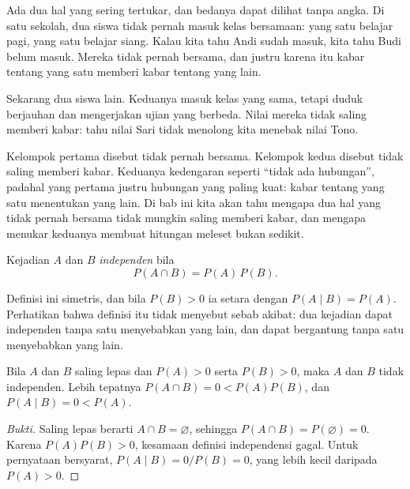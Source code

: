 
\begin{untukanak}
Ada dua hal yang sering tertukar, dan bedanya dapat dilihat tanpa angka. Di satu
sekolah, dua siswa tidak pernah masuk kelas bersamaan: yang satu belajar pagi, yang satu
belajar siang. Kalau kita tahu Andi sudah masuk, kita tahu Budi belum masuk. Mereka tidak
pernah bersama, dan justru karena itu kabar tentang yang satu memberi kabar tentang yang
lain.

Sekarang dua siswa lain. Keduanya masuk kelas yang sama, tetapi duduk berjauhan dan
mengerjakan ujian yang berbeda. Nilai mereka tidak saling memberi kabar: tahu nilai Sari
tidak menolong kita menebak nilai Tono.

Kelompok pertama disebut tidak pernah bersama. Kelompok kedua disebut tidak saling
memberi kabar. Keduanya kedengaran seperti ``tidak ada hubungan'', padahal yang pertama
justru hubungan yang paling kuat: kabar tentang yang satu menentukan yang lain. Di bab
ini kita akan tahu mengapa dua hal yang tidak pernah bersama tidak mungkin saling memberi
kabar, dan mengapa menukar keduanya membuat hitungan meleset bukan sedikit.
\end{untukanak}


\begin{definisi}
Kejadian $A$ dan $B$ \emph{independen} bila
\[
P(A\cap B)=P(A)\,P(B).
\]
\end{definisi}

Definisi ini simetris, dan bila $P(B)>0$ ia setara dengan $P(A\mid B)=P(A)$. Perhatikan
bahwa definisi itu tidak menyebut sebab akibat: dua kejadian dapat independen tanpa satu
menyebabkan yang lain, dan dapat bergantung tanpa satu menyebabkan yang lain.

\begin{proposisi}
Bila $A$ dan $B$ saling lepas dan $P(A)>0$ serta $P(B)>0$, maka $A$ dan $B$ tidak
independen. Lebih tepatnya $P(A\cap B)=0<P(A)P(B)$, dan $P(A\mid B)=0<P(A)$.
\end{proposisi}

\begin{proof}[Bukti]
Saling lepas berarti $A\cap B=\varnothing$, sehingga $P(A\cap B)=P(\varnothing)=0$.
Karena $P(A)P(B)>0$, kesamaan definisi independensi gagal. Untuk pernyataan bersyarat,
$P(A\mid B)=0/P(B)=0$, yang lebih kecil daripada $P(A)>0$.
\end{proof}

